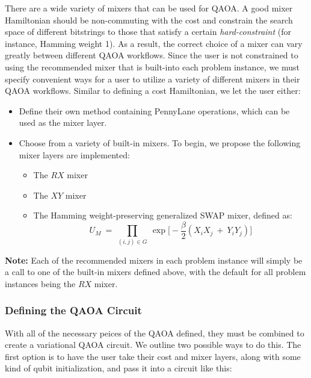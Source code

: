 \documentclass{article}
\begin{document}
There are a wide variety of mixers that can be used for QAOA. A good mixer 
Hamiltonian should be non-commuting with the cost and constrain the search space of different bitstrings 
to those that satisfy a certain \textit{hard-constraint} (for instance, Hamming weight 1). As a result, the correct 
choice of a mixer can vary greatly between different QAOA workflows.
\newline\newline
\noindent
Since the user is not constrained to using the recommended mixer that is built-into each 
problem instance, we must specify convenient ways for a user to utilize a variety of different 
mixers in their QAOA workflows.
\newline\newline
\noindent
Similar to defining a cost Hamiltonian, we let the user either: 
\begin{itemize}
	\item Define their own method 
	      containing PennyLane operations, which 
	      can be used as the mixer layer. 
	\item Choose from a variety of built-in mixers.
              To begin, we propose the following mixer layers are implemented:

		\begin{itemize}
			\item The $RX$ mixer
			\item The $XY$ mixer
			\item The Hamming weight-preserving generalized SWAP mixer, defined as:
				$$U_M \ = \ \displaystyle\prod_{(i, j) \in G} \ \exp \Big[ - \frac{\beta}{2} (X_{i} X_{j} \ + \ Y_{i} Y_{j}) \Big]$$
		\end{itemize}
\end{itemize}
\noindent
\textbf{Note:} Each of the recommended mixers in each problem instance will simply be a call 
to one of the built-in mixers defined above, with the default for all problem instances
being the $RX$ mixer.


\subsubsection{Defining the QAOA Circuit}

With all of the necessary peices of the QAOA defined, they must be combined 
to create a variational QAOA circuit. We outline two possible ways to do this.
\newline\newline
\noindent
The first option is to have the user take their cost and mixer layers, along 
with some kind of qubit initialization, and pass it into a circuit 
like this:
\end{document}
